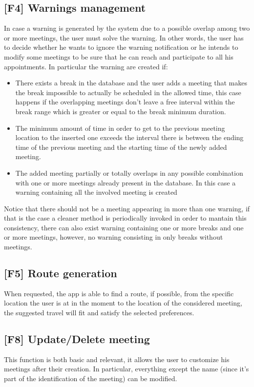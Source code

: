 \subsection{[F4] Warnings management}
In case a warning is generated by the system due to a possible overlap among two or more meetings, the user must solve the warning. In other words, the user has to decide whether he wants to ignore the warning notification or he intends to modify some meetings to be sure that he can reach and participate to all his appointments.
In particular the warning are created if:
\begin{itemize}
\item There exists a break in the database and the user adds a meeting that makes the break impossible to actually be scheduled in the allowed time, this case happens if the overlapping meetings don't leave a free interval within the break range which is greater or equal to the break minimum duration. 
\item The minimum amount of time in order to get to the previous meeting location to the inserted one exceeds the interval there is between the ending time of the previous meeting and the starting time of the newly added meeting.
\item The added meeting partially or totally overlaps in any possible combination with one or more meetings already present in the database. In this case a warning containing all the involved meeting is created

\end{itemize}

Notice that there should not be a meeting appearing in more than one warning, if that is the case a cleaner method is periodically invoked in order to mantain this consistency, there can also exist warning containing one or more breaks and one or more meetings, however, no warning consisting in only breaks without meetings.

\subsection{[F5] Route generation}
When requested, the app is able to find a route, if possible, from the specific location the user is at in the moment to the location of the considered meeting, the suggested travel will fit and satisfy the selected preferences.

\subsection{[F8] Update/Delete meeting}
This function is both basic and relevant, it allows the user to customize his meetings after their creation. In particular, everything except the name (since it's part of the identification of the meeting) can be modified.

